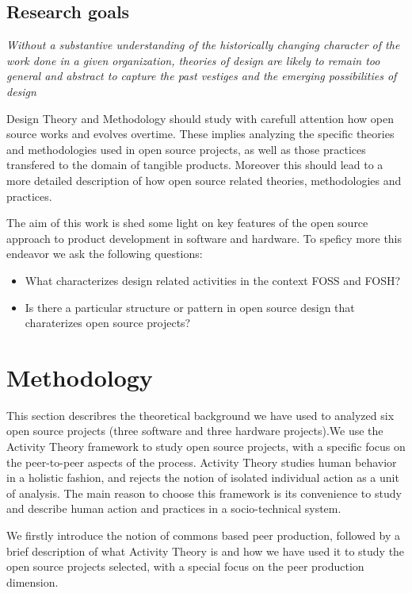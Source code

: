 \documentclass{ICED-Paper}%
\begin{document}
\subsection{Research goals}

\emph{Without a substantive understanding of the historically changing character of the work done in a given organization, theories of design are likely to remain too general and abstract to capture the past vestiges and the emerging possibilities of design}\cite{ExpansiveDesign}

\bigskip

Design Theory and Methodology should study with carefull attention how open source works and evolves overtime. These implies analyzing the specific theories and methodologies used in open source projects, as well as those practices transfered to the domain of tangible products. Moreover this should lead to a more detailed description of how open source related theories, methodologies and practices.
\bigskip

The aim of this work is shed some light on key features of the open source approach to product development in software and hardware. To speficy more this endeavor we ask the following questions:
\bigskip

\begin{itemize}
  \item What characterizes design related activities in the context FOSS and FOSH?
  \item Is there a particular structure or pattern in open source design that charaterizes open source projects?
\end{itemize}


\section{Methodology}
This section describres the theoretical background we have used to analyzed six open source projects (three software and three hardware projects).We use the Activity Theory framework to study open source projects, with a specific focus on the peer-to-peer aspects of the process. Activity Theory studies human behavior in a holistic fashion, and rejects the notion of isolated individual action as a unit of analysis. The main reason to choose this framework is its convenience to study and describe human action and practices in a socio-technical system.

We firstly introduce the notion of commons based peer production, followed by a brief description of what  Activity Theory is and how we have used it to study the open source projects selected, with a special focus on the peer production dimension.
\end{document}
